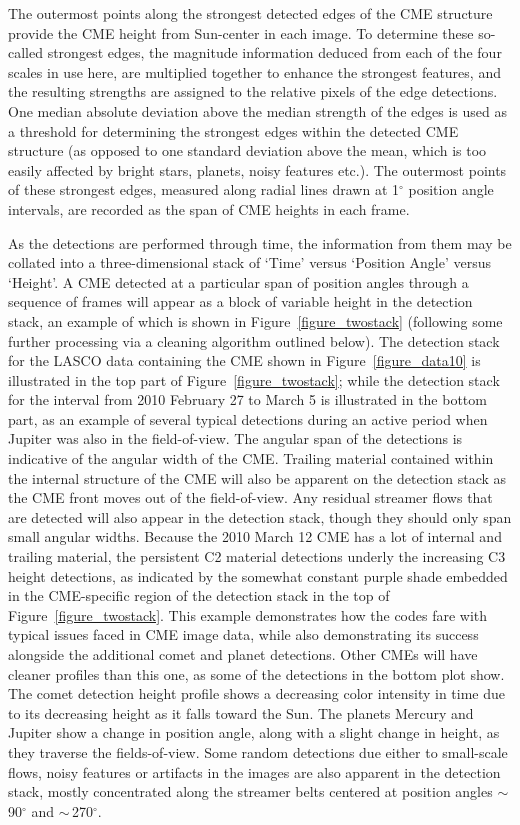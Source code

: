 \documentclass[preprint2]{aastex}
\begin{document}
The outermost points along the strongest detected edges of the CME structure provide the CME height from Sun-center in each image. To determine these so-called strongest edges, the magnitude information deduced from each of the four scales in use here, are multiplied together to enhance the strongest features, and the resulting strengths are assigned to the relative pixels of the edge detections. One median absolute deviation above the median strength of the edges is used as a threshold for determining the strongest edges within the detected CME structure (as opposed to one standard deviation above the mean, which is too easily affected by bright stars, planets, noisy features etc.). The outermost points of these strongest edges, measured along radial lines drawn at 1$^{\circ}$ position angle intervals, are recorded as the span of CME heights in each frame.

As the detections are performed through time, the information from them may be collated into a three-dimensional stack of `Time' versus `Position Angle' versus `Height'. A CME detected at a particular span of position angles through a sequence of frames will appear as a block of variable height in the detection stack, an example of which is shown in Figure~\ref{figure_twostack} (following some further processing via a cleaning algorithm outlined below). The detection stack for the LASCO data containing the CME shown in Figure~\ref{figure_data10} is illustrated in the top part of Figure~\ref{figure_twostack}; while the detection stack for the interval from 2010 February 27 to March 5 is illustrated in the bottom part, as an example of several typical detections during an active period when Jupiter was also in the field-of-view. The angular span of the detections is indicative of the angular width of the CME. Trailing material contained within the internal structure of the CME will also be apparent on the detection stack as the CME front moves out of the field-of-view. Any residual streamer flows that are detected will also appear in the detection stack, though they should only span small angular widths. Because the 2010 March 12 CME has a lot of internal and trailing material, the persistent C2 material detections underly the increasing C3 height detections, as indicated by the somewhat constant purple shade embedded in the CME-specific region of the detection stack in the top of Figure~\ref{figure_twostack}. This example demonstrates how the codes fare with typical issues faced in CME image data, while also demonstrating its success alongside the additional comet and planet detections. Other CMEs will have cleaner profiles than this one, as some of the detections in the bottom plot show. The comet detection height profile shows a decreasing color intensity in time due to its decreasing height as it falls toward the Sun. The planets Mercury and Jupiter show a change in position angle, along with a slight change in height, as they traverse the fields-of-view. Some random detections due either to small-scale flows, noisy features or artifacts in the images are also apparent in the detection stack, mostly concentrated along the streamer belts centered at position angles $\sim$\,90$^{\circ}$ and $\sim$\,270$^{\circ}$.
\end{document}
